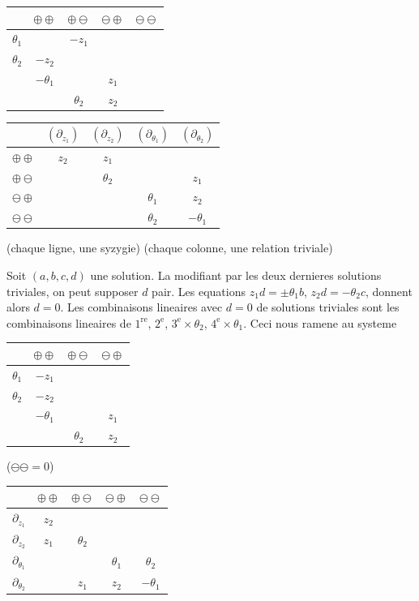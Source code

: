 \documentclass[11pt,a4paper]{article}
\theoremstyle{plain}
\theoremstyle{definition}
\begin{document}
\begin{center}
\begin{tabular}{c|cccc}
& $\oplus\oplus$ & $\oplus\ominus$ & $\ominus\oplus$ & $\ominus\ominus$ \\
\hline
$\theta_1$ & & $-z_1$ & & \\
$\theta_2$ & $-z_2$ & & & \\
& $-\theta_1$ & & $z_1$ & \\
& & $\theta_2$ & $z_2$ &
\end{tabular}
\qquad
\begin{tabular}{c|cccc}
& $(\partial_{z_1})$ & $(\partial_{z_2})$ & $(\partial_{\theta_1})$ & $(\partial_{\theta_2})$ \\
\hline
$\oplus\oplus$ & $z_2$ & $z_1$ & & \\
$\oplus\ominus$ & & $\theta_2$ & & $z_1$ \\
$\ominus\oplus$ & & & $\theta_1$ & $z_2$ \\
$\ominus\ominus$ & & & $\theta_2$ & $-\theta_1$
\end{tabular}
\end{center}

(chaque ligne, une syzygie) \hfill (chaque colonne, une relation triviale)

Soit $(a,b,c,d)$ une solution. La modifiant par les deux dernieres solutions triviales, on peut supposer $d$ pair. Les equations $z_1 d = \pm \theta_1 b$, $z_2 d = -\theta_2 c$, donnent alors $d = 0$. Les combinaisons lineaires avec $d = 0$ de solutions triviales sont les combinaisons lineaires de $1^{\text{re}}$, $2^{\text{e}}$, $3^{\text{e}} \times \theta_2$, $4^{\text{e}} \times \theta_1$. Ceci nous ramene au systeme

\newpage

\begin{center}
\begin{tabular}{c|ccc}
& $\oplus\oplus$ & $\oplus\ominus$ & $\ominus\oplus$ \\
\hline
$\theta_1$ & $-z_1$ & & \\
$\theta_2$ & $-z_2$ & & \\
& $-\theta_1$ & & $z_1$ \\
& & $\theta_2$ & $z_2$
\end{tabular}
\qquad ($\ominus\ominus = 0$)
\end{center}
\begin{center}
\begin{tabular}{c|cccc}
& $\oplus\oplus$ & $\oplus\ominus$ & $\ominus\oplus$ & $\ominus\ominus$ \\
\hline
$\partial_{z_1}$ & $z_2$ & & & \\
$\partial_{z_2}$ & $z_1$ & $\theta_2$ & & \\
$\partial_{\theta_1}$ & & & $\theta_1$ & $\theta_2$ \\
$\partial_{\theta_2}$ & & $z_1$ & $z_2$ & $-\theta_1$
\end{tabular}
\end{center}
\end{document}
